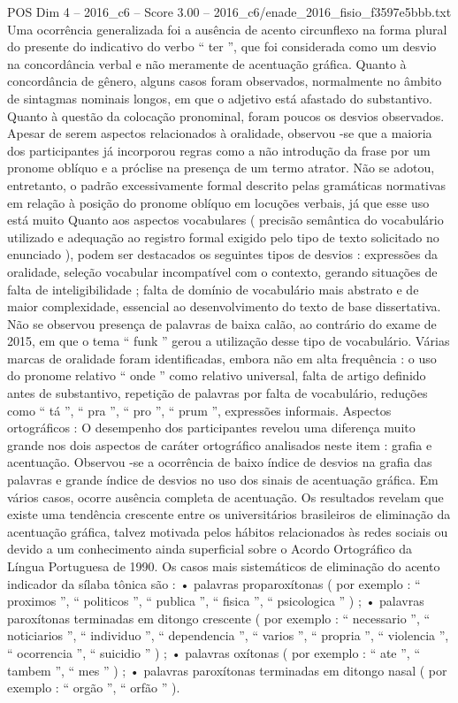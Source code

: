 \begin{textsample}{POS Dim 4 – 2016\_c6 – Score 3.00 – 2016\_c6/enade\_2016\_fisio\_f3597e5bbb.txt}
Uma ocorrência generalizada foi a ausência de acento circunflexo na forma plural do presente do indicativo do verbo “ ter ”, que foi considerada como um desvio na concordância verbal e não meramente de acentuação gráfica.
Quanto à concordância de gênero, alguns casos foram observados, normalmente no âmbito de sintagmas nominais longos, em que o adjetivo está afastado do substantivo.
Quanto à questão da colocação pronominal, foram poucos os desvios observados.
Apesar de serem aspectos relacionados à oralidade, observou -se que a maioria dos participantes já incorporou regras como a não introdução da frase por um pronome oblíquo e a próclise na presença de um termo atrator.
Não se adotou, entretanto, o padrão excessivamente formal descrito pelas gramáticas normativas em relação à posição do pronome oblíquo em locuções verbais, já que esse uso está muito Quanto aos aspectos vocabulares ( precisão semântica do vocabulário utilizado e adequação ao registro formal exigido pelo tipo de texto solicitado no enunciado ), podem ser destacados os seguintes tipos de desvios : expressões da oralidade, seleção vocabular incompatível com o contexto, gerando situações de falta de inteligibilidade ; falta de domínio de vocabulário mais abstrato e de maior complexidade, essencial ao desenvolvimento do texto de base dissertativa.
Não se observou presença de palavras de baixa calão, ao contrário do exame de 2015, em que o tema “ funk ” gerou a utilização desse tipo de vocabulário.
Várias marcas de oralidade foram identificadas, embora não em alta frequência : o uso do pronome relativo “ onde ” como relativo universal, falta de artigo definido antes de substantivo, repetição de palavras por falta de vocabulário, reduções como “ tá ”, “ pra ”, “ pro ”, “ prum ”, expressões informais.
Aspectos ortográficos : O desempenho dos participantes revelou uma diferença muito grande nos dois aspectos de caráter ortográfico analisados neste item : grafia e acentuação.
Observou -se a ocorrência de baixo índice de desvios na grafia das palavras e grande índice de desvios no uso dos sinais de acentuação gráfica.
Em vários casos, ocorre ausência completa de acentuação.
Os resultados revelam que existe uma tendência crescente entre os universitários brasileiros de eliminação da acentuação gráfica, talvez motivada pelos hábitos relacionados às redes sociais ou devido a um conhecimento ainda superficial sobre o Acordo Ortográfico da Língua Portuguesa de 1990.
Os casos mais sistemáticos de eliminação do acento indicador da sílaba tônica são : • palavras proparoxítonas ( por exemplo : “ proximos ”, “ politicos ”, “ publica ”, “ fisica ”, “ psicologica ” ) ; • palavras paroxítonas terminadas em ditongo crescente ( por exemplo : “ necessario ”, “ noticiarios ”, “ individuo ”, “ dependencia ”, “ varios ”, “ propria ”, “ violencia ”, “ ocorrencia ”, “ suicidio ” ) ; • palavras oxítonas ( por exemplo : “ ate ”, “ tambem ”, “ mes ” ) ; • palavras paroxítonas terminadas em ditongo nasal ( por exemplo : “ orgão ”, “ orfão ” ).

\end{textsample}
